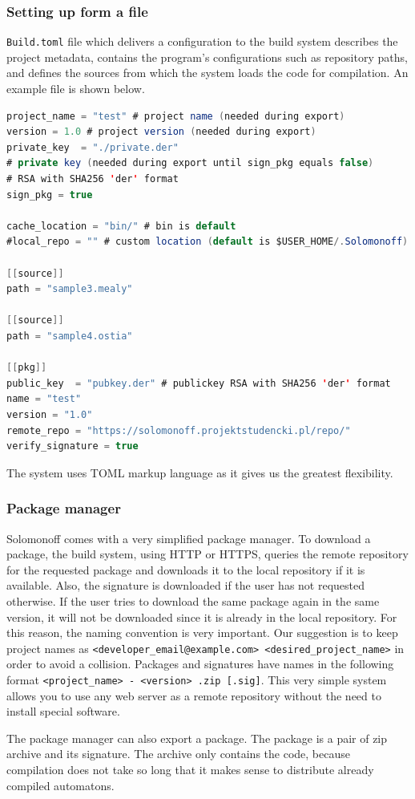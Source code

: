 \hypertarget{setting-up-form-a-file}{%
\subsubsection{Setting up form a file}\label{setting-up-form-a-file}}

\texttt{Build.toml} file which delivers a configuration to the build system
describes the project metadata, contains the program's configurations
such as repository paths, and defines the sources from which the system
loads the code for compilation. An example file is shown below.

\begin{lstlisting}[language=Java]
project_name = "test" # project name (needed during export)
version = 1.0 # project version (needed during export)
private_key  = "./private.der" 
# private key (needed during export until sign_pkg equals false) 
# RSA with SHA256 'der' format
sign_pkg = true

cache_location = "bin/" # bin is default 
#local_repo = "" # custom location (default is $USER_HOME/.Solomonoff)

[[source]]
path = "sample3.mealy"

[[source]]
path = "sample4.ostia"

[[pkg]]
public_key  = "pubkey.der" # publickey RSA with SHA256 'der' format
name = "test" 
version = "1.0"
remote_repo = "https://solomonoff.projektstudencki.pl/repo/"
verify_signature = true
\end{lstlisting}

The system uses TOML markup language as it gives us the greatest
flexibility.

\hypertarget{package-manager}{%
\subsubsection{Package manager}\label{package-manager}}

Solomonoff comes with a very simplified package manager. To download a
package, the build system, using HTTP or HTTPS, queries the remote
repository for the requested package and downloads it to the local
repository if it is available. Also, the signature is downloaded if the
user has not requested otherwise. If the user tries to download the same
package again in the same version, it will not be downloaded since it is
already in the local repository. For this reason, the naming convention
is very important. Our suggestion is to keep project names as
\texttt{\textless{}developer\_email@example.com\textgreater{}\ \textless{}desired\_project\_name\textgreater{}}
in order to avoid a collision. Packages and signatures have names in the
following format
\texttt{\textless{}project\_name\textgreater{}\ -\ \textless{}version\textgreater{}\ .zip\ {[}.sig{]}}.
This very simple system allows you to use any web server as a remote
repository without the need to install special software. 

The package manager can also export a package. The package is a pair of zip archive
and its signature. The archive only contains the code, because
compilation does not take so long that it makes sense to distribute
already compiled automatons.
